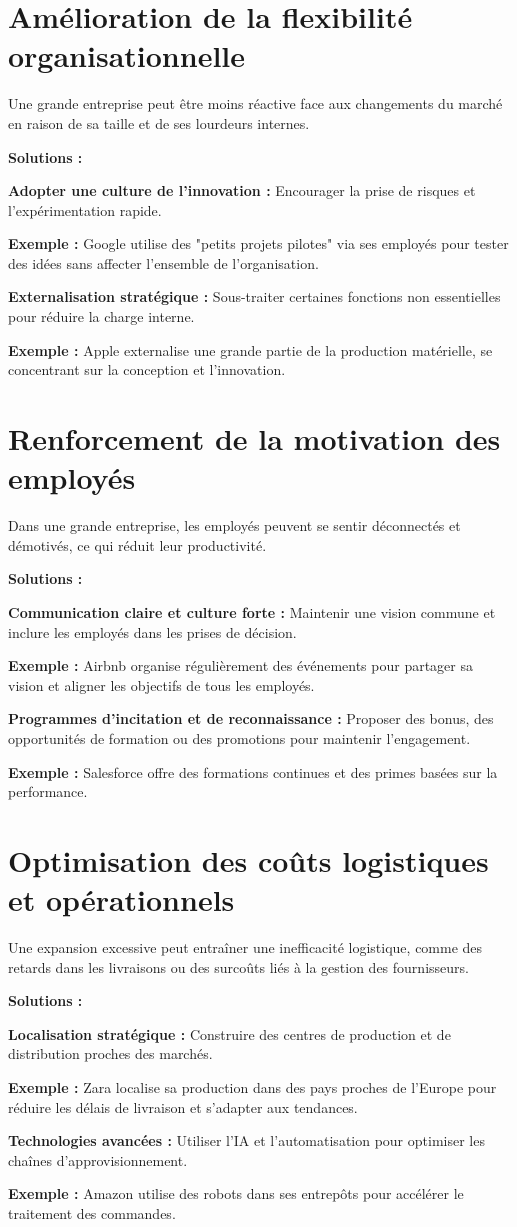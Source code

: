 \section{Amélioration de la flexibilité organisationnelle}
Une grande entreprise peut être moins réactive face aux changements du marché en raison de sa
taille et de ses lourdeurs internes.
\par
\textbf{Solutions :}
\par
\textbf{Adopter une culture de l'innovation :} Encourager la prise de risques et l'expérimentation rapide.
\par
\textbf{Exemple :} Google utilise des "petits projets pilotes" via ses employés pour tester des idées sans
affecter l'ensemble de l'organisation.
\par
\textbf{Externalisation stratégique :} Sous-traiter certaines fonctions non essentielles pour réduire la charge
interne.
\par
\textbf{Exemple :} Apple externalise une grande partie de la production matérielle, se concentrant sur
la conception et l’innovation.
\section{Renforcement de la motivation des employés}
Dans une grande entreprise, les employés peuvent se sentir déconnectés et démotivés, ce qui réduit
leur productivité.
\par
\textbf{Solutions :}
\par
\textbf{Communication claire et culture forte :} Maintenir une vision commune et inclure les employés
dans les prises de décision.
\par
\textbf{Exemple :} Airbnb organise régulièrement des événements pour partager sa vision et aligner
les objectifs de tous les employés.
\par
\textbf{Programmes d’incitation et de reconnaissance :} Proposer des bonus, des opportunités de
formation ou des promotions pour maintenir l'engagement.
\par
\textbf{Exemple :} Salesforce offre des formations continues et des primes basées sur la performance.
\section{Optimisation des coûts logistiques et opérationnels}
Une expansion excessive peut entraîner une inefficacité logistique, comme des retards dans les
livraisons ou des surcoûts liés à la gestion des fournisseurs.
\par
\textbf{Solutions :}
\par
\textbf{Localisation stratégique :} Construire des centres de production et de distribution proches des
marchés.
\par
\textbf{Exemple :} Zara localise sa production dans des pays proches de l’Europe pour réduire
les délais de livraison et s’adapter aux tendances.
\par
\textbf{Technologies avancées :} Utiliser l’IA et l’automatisation pour optimiser les chaînes
d'approvisionnement.
\par
\textbf{Exemple :} Amazon utilise des robots dans ses entrepôts pour accélérer le
traitement des commandes.

